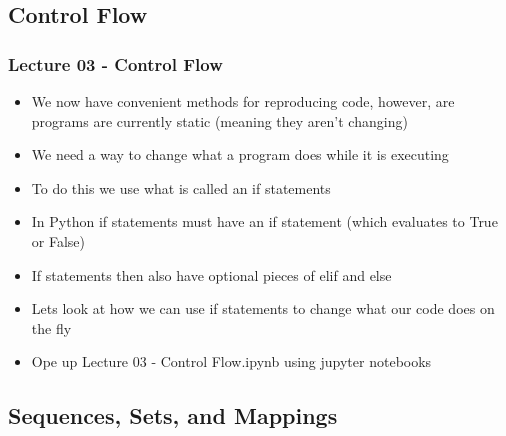 \documentclass[mini frame in current subsection]{beamer}
\begin{document}
	\subsection{Control Flow}
	
		\begin{frame}
			\frametitle{Lecture 03 - Control Flow}
			\begin{itemize}
				\vfill\item  We now have convenient methods for reproducing code, however, are programs are currently static (meaning they aren't changing)
				\vfill\item  We need a way to change what a program does while it is executing
				\vfill\item  To do this we use what is called an if statements
				\vfill\item  In Python if statements must have an if statement (which evaluates to True or False)
				\vfill\item  If statements then also have optional pieces of elif and else
				\vfill\item  Lets look at how we can use if statements to change what our code does on the fly
				\vfill\item  Ope up Lecture 03 - Control Flow.ipynb using jupyter notebooks
			\end{itemize}
		\end{frame}
		
	\subsection{Sequences, Sets, and Mappings}
	
\end{document}
